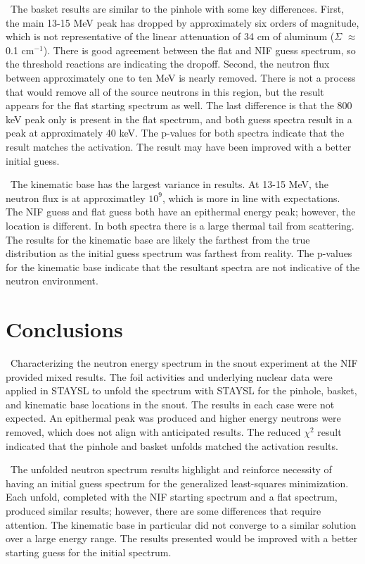 \documentclass[journal]{IEEEtran}
\begin{document}
	\ The basket results are similar to the pinhole with some key differences. First, the main 13-15 MeV peak has dropped by approximately six orders of magnitude, which is not representative of the linear attenuation of 34 cm of aluminum ($\Sigma$ $\approx$ 0.1 cm$^{-1}$). There is good agreement between the flat and NIF guess spectrum, so the threshold reactions are indicating the dropoff. Second, the neutron flux between approximately one to ten MeV is nearly removed. There is not a process that would remove all of the source neutrons in this region, but the result appears for the flat starting spectrum as well. The last difference is that the 800 keV peak only is present in the flat spectrum, and both guess spectra result in a peak at approximately 40 keV. The p-values for both spectra indicate that the result matches the activation. The result may have been improved with a better initial guess. 
	
	\ The kinematic base has the largest variance in results. At 13-15 MeV, the neutron flux is at approximatley $10^{9}$, which is more in line with expectations. The NIF guess and flat guess both have an epithermal energy peak; however, the location is different. In both spectra there is a large thermal tail from scattering. The results for the kinematic base are likely the farthest from the true distribution as the initial guess spectrum was farthest from reality. The p-values for the kinematic base indicate that the resultant spectra are not indicative of the neutron environment. 
	 
	\section{Conclusions}
	
	\ Characterizing the neutron energy spectrum in the snout experiment at the NIF provided mixed results. The foil activities and underlying nuclear data were applied in STAYSL to unfold the spectrum with STAYSL for the pinhole, basket, and kinematic base locations in the snout. The results in each case were not expected. An epithermal peak was produced and higher energy neutrons were removed, which does not align with anticipated results. The reduced $\chi^{2}$  result indicated that the pinhole and basket unfolds matched the activation results. 
	
	\ The unfolded neutron spectrum results highlight and reinforce necessity of having an initial guess spectrum for the generalized least-squares minimization. Each unfold, completed with the NIF starting spectrum and a flat spectrum, produced similar results; however, there are some differences that require attention. The kinematic base in particular did not converge to a similar solution over a large energy range. The results presented would be improved with a better starting guess for the initial spectrum. 
\end{document}
